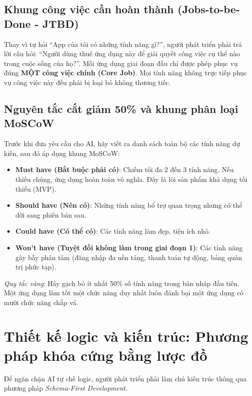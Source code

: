 \documentclass[a4paper,11pt]{article}
\begin{document}
\subsection{Khung công việc cần hoàn thành (Jobs-to-be-Done - JTBD)}

Thay vì tự hỏi ``App của tôi có những tính năng gì?'', người phát triển phải trả lời câu hỏi: ``Người dùng thuê ứng dụng này để giải quyết công việc cụ thể nào trong cuộc sống của họ?''. 
Mỗi ứng dụng giai đoạn đầu chỉ được phép phục vụ đúng \textbf{MỘT công việc chính (Core Job)}. Mọi tính năng không trực tiếp phục vụ công việc này đều phải bị loại bỏ không thương tiếc.

\subsection{Nguyên tắc cắt giảm 50\% và khung phân loại MoSCoW}

Trước khi đưa yêu cầu cho AI, hãy viết ra danh sách toàn bộ các tính năng dự kiến, sau đó áp dụng khung MoSCoW:
\begin{itemize}[leftmargin=1.5em]
    \item \textbf{Must have (Bắt buộc phải có)}: Chiếm tối đa 2 đến 3 tính năng. Nếu thiếu chúng, ứng dụng hoàn toàn vô nghĩa. Đây là lõi sản phẩm khả dụng tối thiểu (MVP).
    \item \textbf{Should have (Nên có)}: Những tính năng bổ trợ quan trọng nhưng có thể dời sang phiên bản sau.
    \item \textbf{Could have (Có thể có)}: Các tính năng làm đẹp, tiện ích nhỏ.
    \item \textbf{Won't have (Tuyệt đối không làm trong giai đoạn 1)}: Các tính năng gây bẫy phân tâm (đăng nhập đa nền tảng, thanh toán tự động, bảng quản trị phức tạp).
\end{itemize}
\textit{Quy tắc vàng}: Hãy gạch bỏ ít nhất 50\% số tính năng trong bản nháp đầu tiên. Một ứng dụng làm tốt một chức năng duy nhất luôn đánh bại một ứng dụng có mười chức năng chắp vá.

\section{Thiết kế logic và kiến trúc: Phương pháp khóa cứng bằng lược đồ}

Để ngăn chặn AI tự chế logic, người phát triển phải làm chủ kiến trúc thông qua phương pháp \textit{Schema-First Development}.
\end{document}
